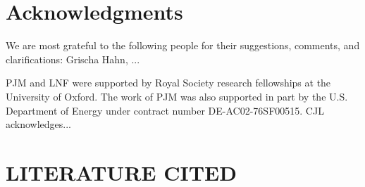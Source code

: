 \documentclass{ar2e}
\begin{document}

\section*{Acknowledgments}

We are most grateful to the following people for their suggestions, 
comments, and clarifications: Grischa Hahn, ... 

PJM and LNF were supported by Royal Society research fellowships at the
University of Oxford. The work of PJM was also supported in part  by the U.S.
Department of Energy under contract number DE-AC02-76SF00515.
%
CJL acknowledges...



\section{LITERATURE CITED}





\end{document}
